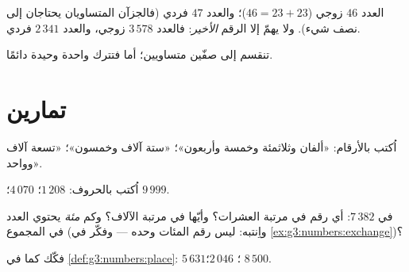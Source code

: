 \begin{example}
العدد $46$ زوجي ($46 = 23 + 23$)؛ والعدد $47$ فردي (فالجزآن
المتساويان يحتاجان إلى نصف شيء). ولا يهمّ إلا الرقم
\emph{الأخير}: فالعدد $3\,578$ زوجي، والعدد $2\,341$ فردي.
\end{example}

\begin{omfigure}

{\small {} تنقسم إلى صفّين متساويين؛ أما 
فتترك واحدة وحيدة دائمًا.}
\end{omfigure}

\section{تمارين}

\begin{exercise}[$\star$]\label{exo:g3:numbers:1}
اُكتب بالأرقام: «ألفان وثلاثمئة وخمسة وأربعون»؛ «ستة
آلاف وخمسون»؛ «تسعة آلاف وواحد».
\end{exercise}

\begin{exercise}[$\star$]\label{exo:g3:numbers:2}
اُكتب بالحروف: $1\,208$؛ \quad $4\,070$؛ \quad $9\,999$.
\end{exercise}

\begin{exercise}[$\star$]\label{exo:g3:numbers:3}
في $7\,382$: أي رقم في مرتبة العشرات؟ وأيّها في مرتبة
الآلاف؟ وكم \emph{مئة} يحتوي العدد في المجموع (واِنتبه: ليس رقم
المئات وحده --- وفكّر في
\cref{ex:g3:numbers:exchange})؟
\end{exercise}

\begin{exercise}[$\star$]\label{exo:g3:numbers:4}
فكّك كما في \cref{def:g3:numbers:place}:
$5\,631$؛ \quad $2\,046$؛ \quad $8\,500$.
\end{exercise}

